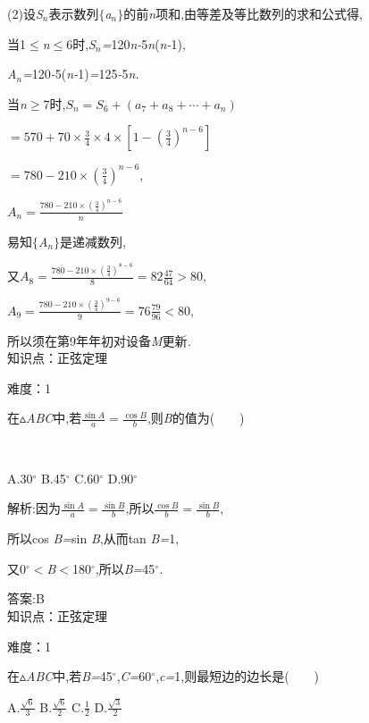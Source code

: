 \documentclass{article} %
\begin{document}
 (2)设\textit{S${}_{n}$}表示数列$\mathrm{\{}$\textit{a${}_{n}$}$\mathrm{\}}$的前\textit{n}项和,由等差及等比数列的求和公式得,

当1$\mathrm{\le}$\textit{n}$\mathrm{\le}$6时,\textit{S${}_{n}$=}120\textit{n-}5\textit{n}(\textit{n-}1),

\textit{A${}_{n}$=}120\textit{-}5(\textit{n-}1)\textit{=}125\textit{-}5\textit{n.}

当\textit{n}$\mathrm{\ge}$7时,$S_n=S_6+(a_7+a_8+\cdots+a_n)$

$=570+70\times \frac{3}{4}\times 4\times [1-(\frac{3}{4})^{n-6}]$

$=780-210\times (\frac{3}{4})^{n-6}$,

$A_n=\frac{780-210\times (\frac{3}{4})^{n-6}}{n}$

易知$\mathrm{\{}$\textit{A${}_{n}$}$\mathrm{\}}$是递减数列,

又$A_8=\frac{780-210\times (\frac{3}{4})^{8-6}}{8}=82\frac{47}{64}>80$,

$A_9=\frac{780-210\times (\frac{3}{4})^{9-6}}{9}=76\frac{79}{96}<80$,

所以须在第9年年初对设备\textit{M}更新\textit{.} \\

知识点：正弦定理

难度：1

 在$\mathrm{\vartriangle}$\textit{ABC}中,若$\frac{\sin A}{a}=\frac{\cos B}{b}$,则\textit{B}的值为(\textit{　　})

 \textit{　　　　　　　　　　　　　　　　}

 A.30$\mathrm{{}^\circ}$ B.45$\mathrm{{}^\circ}$ C.60$\mathrm{{}^\circ}$ D.90$\mathrm{{}^\circ}$

 解析:因为$\frac{\sin A}{a}=\frac{\sin B}{b}$,所以$\frac{\cos B}{b} = \frac{\sin B}{b}$,

所以cos \textit{B=}sin \textit{B},从而tan \textit{B=}1,

又0$\mathrm{{}^\circ}$\textit{$<$B$<$}180$\mathrm{{}^\circ}$,所以\textit{B=}45$\mathrm{{}^\circ}$\textit{.}

 答案:B \\

知识点：正弦定理

难度：1

 在$\mathrm{\vartriangle}$\textit{ABC}中,若\textit{B=}45$\mathrm{{}^\circ}$,\textit{C=}60$\mathrm{{}^\circ}$,\textit{c=}1,则最短边的边长是(\textit{　　})

 A.$\frac{\sqrt{6}}{3}$ B.$\frac{\sqrt{6}}{2}$ C.$\frac{1}{2}$ D.$\frac{\sqrt{3}}{2}$
\end{document}
